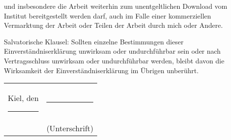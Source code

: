 \documentclass[11pt,oneside]{article}
\begin{document}
und insbesondere die Arbeit weiterhin zum unentgeltlichen Download
vom Institut bereitgestellt werden darf,
auch im Falle einer kommerziellen Vermarktung der Arbeit
oder Teilen der Arbeit durch mich oder Andere.
%
%
%
\par\medskip\small
Salvatorische Klausel:
Sollten einzelne Bestimmungen dieser Einverständniserklärung
unwirksam oder undurchführbar sein
oder nach Vertragsschluss unwirksam oder undurchführbar werden,
bleibt davon die Wirksamkeit der Einverständniserklärung im Übrigen unberührt.
\normalsize\par\bigskip\bigskip\medskip
\begin{tabular}{@{}p{}@{}p{}@{}}
  Kiel, den \rule{10em}{.3pt} & \hfill\rule{12em}{.3pt} \\
  & \hfill\begin{minipage}{12em}\centering(Unterschrift)\end{minipage}
\end{tabular}
\end{document}
